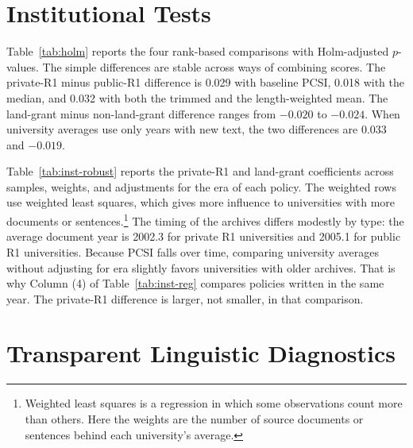\documentclass[11pt]{article}
\begin{document}



\section{Institutional Tests}\label{app:inst}
\setcounter{table}{0}

Table~\ref{tab:holm} reports the four rank-based comparisons with Holm-adjusted $p$-values. The simple differences are stable across ways of combining scores. The private-R1 minus public-R1 difference is 0.029 with baseline PCSI, 0.018 with the median, and 0.032 with both the trimmed and the length-weighted mean. The land-grant minus non-land-grant difference ranges from $-0.020$ to $-0.024$. When university averages use only years with new text, the two differences are 0.033 and $-0.019$.



Table~\ref{tab:inst-robust} reports the private-R1 and land-grant coefficients across samples, weights, and adjustments for the era of each policy. The weighted rows use weighted least squares, which gives more influence to universities with more documents or sentences.\footnote{Weighted least squares is a regression in which some observations count more than others. Here the weights are the number of source documents or sentences behind each university's average.} The timing of the archives differs modestly by type: the average document year is 2002.3 for private R1 universities and 2005.1 for public R1 universities. Because PCSI falls over time, comparing university averages without adjusting for era slightly favors universities with older archives. That is why Column (4) of Table~\ref{tab:inst-reg} compares policies written in the same year. The private-R1 difference is larger, not smaller, in that comparison.



\section{Transparent Linguistic Diagnostics}\label{app:linguistic}
\setcounter{table}{0}
\end{document}
